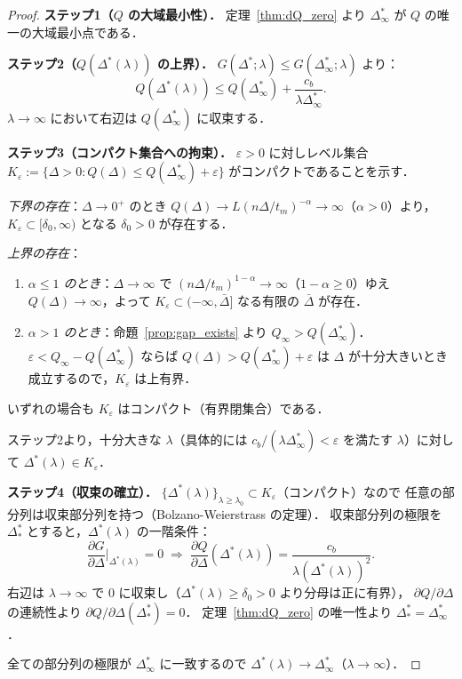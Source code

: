\documentclass[12pt,a4paper]{article}
\theoremstyle{plain}
\theoremstyle{definition}
\theoremstyle{remark}
\newcommand{\Dopt}{\Delta^{*}}
\newcommand{\Dinf}{\Delta^{*}_{\infty}}
\begin{document}
\begin{proof}
\textbf{ステップ1（$Q$ の大域最小性）．}
定理~\ref{thm:dQ_zero} より $\Dinf$ が $Q$ の唯一の大域最小点である．

\textbf{ステップ2（$Q(\Dopt(\lambda))$ の上界）．}
$G(\Dopt;\lambda)\le G(\Dinf;\lambda)$ より：
\begin{equation}\label{eq:Q_upper}
Q(\Dopt(\lambda))\le Q(\Dinf)+\frac{c_b}{\lambda\Dinf}.
\end{equation}
$\lambda\to\infty$ において右辺は $Q(\Dinf)$ に収束する．

\textbf{ステップ3（コンパクト集合への拘束）．}
$\varepsilon>0$ に対しレベル集合 $K_\varepsilon:=\{\Delta>0:Q(\Delta)\le Q(\Dinf)+\varepsilon\}$ がコンパクトであることを示す．

\emph{下界の存在}：$\Delta\to0^+$ のとき $Q(\Delta)\to L(n\Delta/t_m)^{-\alpha}\to\infty$（$\alpha>0$）より，
$K_\varepsilon\subset[\delta_0,\infty)$ となる $\delta_0>0$ が存在する．

\emph{上界の存在}：
\begin{enumerate}[leftmargin=*,label=\textbullet]
\item \emph{$\alpha\le1$ のとき}：$\Delta\to\infty$ で $(n\Delta/t_m)^{1-\alpha}\to\infty$（$1-\alpha\ge0$）ゆえ
  $Q(\Delta)\to\infty$，よって $K_\varepsilon\subset(-\infty,\bar\Delta]$ なる有限の $\bar\Delta$ が存在．
\item \emph{$\alpha>1$ のとき}：命題~\ref{prop:gap_exists} より $Q_\infty>Q(\Dinf)$．
  $\varepsilon<Q_\infty-Q(\Dinf)$ ならば $Q(\Delta)>Q(\Dinf)+\varepsilon$ は
  $\Delta$ が十分大きいとき成立するので，$K_\varepsilon$ は上有界．
\end{enumerate}

いずれの場合も $K_\varepsilon$ はコンパクト（有界閉集合）である．

ステップ2より，十分大きな $\lambda$（具体的には $c_b/(\lambda\Dinf)<\varepsilon$ を満たす $\lambda$）に対して
$\Dopt(\lambda)\in K_\varepsilon$．

\textbf{ステップ4（収束の確立）．}
$\{\Dopt(\lambda)\}_{\lambda\ge\lambda_0}\subset K_\varepsilon$（コンパクト）なので
任意の部分列は収束部分列を持つ（Bolzano-Weierstrass の定理）．
収束部分列の極限を $\Dopt_*$ とすると，$\Dopt(\lambda)$ の一階条件：
\[
\frac{\partial G}{\partial\Delta}\bigg|_{\Dopt(\lambda)}=0
\;\Longrightarrow\;
\frac{\partial Q}{\partial\Delta}(\Dopt(\lambda))=\frac{c_b}{\lambda(\Dopt(\lambda))^2}.
\]
右辺は $\lambda\to\infty$ で $0$ に収束し（$\Dopt(\lambda)\ge\delta_0>0$ より分母は正に有界），
$\partial Q/\partial\Delta$ の連続性より $\partial Q/\partial\Delta(\Dopt_*)=0$．
定理~\ref{thm:dQ_zero} の唯一性より $\Dopt_*=\Dinf$．

全ての部分列の極限が $\Dinf$ に一致するので $\Dopt(\lambda)\to\Dinf$（$\lambda\to\infty$）．
\end{proof}
\end{document}
